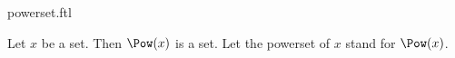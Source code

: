 \documentclass{stex}
\begin{document}
\begin{smodule}{powerset.ftl}



\begin{axiom*}[forthel,title=Powerset,name=Powerset Axiom]
  Let $x$ be a set.
  Then $\Pow(x)$ is a set.
  Let the powerset of $x$ stand for $\Pow(x)$.
\end{axiom*}

\end{smodule}
\end{document}
